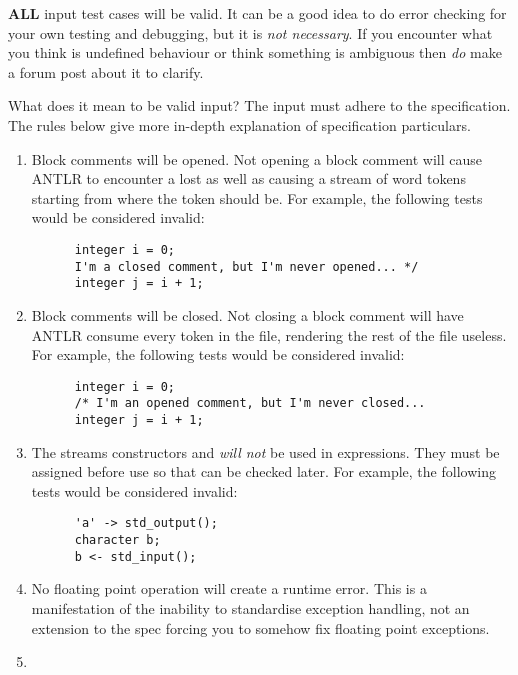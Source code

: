 \documentclass[../gazprea.tex]{subfiles}
\begin{document}
\textbf{ALL} input test cases will be valid. It can be a good idea to do error checking for your
own testing and debugging, but it is \textit{not necessary}. If you encounter what you think is
undefined behaviour or think something is ambiguous then \textit{do} make a forum post about it to
clarify.

What does it mean to be valid input? The input must adhere to the specification. The rules below
give more in-depth explanation of specification particulars.
\begin{enumerate}
  \item
    Block comments will be opened. Not opening a block comment will cause ANTLR to encounter a lost
    \code{*/} as well as causing a stream of word tokens starting from where the \code{/*} token
    should be. For example, the following tests would be considered invalid:
    \begin{lstlisting}
      integer i = 0;
      I'm a closed comment, but I'm never opened... */
      integer j = i + 1;
    \end{lstlisting}
  \item
    Block comments will be closed. Not closing a block comment will have ANTLR consume every token
    in the file, rendering the rest of the file useless. For example, the following tests would be
    considered invalid:
    \begin{lstlisting}
      integer i = 0;
      /* I'm an opened comment, but I'm never closed...
      integer j = i + 1;
    \end{lstlisting}
  \item
    The streams constructors  and  \textit{will not} be used
    in expressions. They must be assigned before use so that  can be checked
    later. For example, the following tests would be considered invalid:
    \begin{lstlisting}
      'a' -> std_output();
      character b;
      b <- std_input();
    \end{lstlisting}
  \item
    No floating point operation will create a runtime error. This is a manifestation of the
    inability to standardise exception handling, not an extension to the spec forcing you to somehow
    fix floating point exceptions.
  \item

\end{enumerate}
\end{document}
